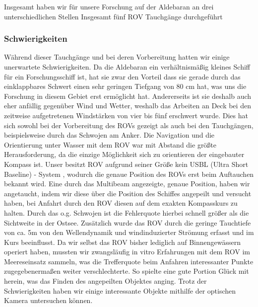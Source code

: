 Insgesamt haben wir für unsere Forschung auf der Aldebaran an drei unterschiedlichen Stellen Insgesamt fünf ROV Tauchgänge durchgeführt 
\subsubsection{Schwierigkeiten}
Während dieser Tauchgänge und bei deren Vorbereitung hatten wir einige unerwartete Schwierigkeiten.
Da die Aldebaran ein verhältnismäßig kleines Schiff für ein Forschungsschiff ist, hat sie zwar den Vorteil dass sie gerade durch das einklappbares Schwert einen sehr geringen Tiefgang von 80 cm hat, was uns die Forschung in diesem Gebiet erst ermöglicht hat.
Andererseits ist sie deshalb auch eher anfällig gegenüber Wind und Wetter, weshalb das Arbeiten an Deck bei den zeitweise aufgetretenen Windstärken von vier bis fünf erschwert wurde.
Dies hat sich sowohl bei der Vorbereitung des ROVs gezeigt als auch bei den Tauchgängen, beispielsweise durch das Schwojen am Anker.
Die Navigation und die Orientierung unter Wasser mit dem ROV war mit Abstand die größte Herausforderung, da die einzige Möglichkeit sich zu orientieren der eingebauter Kompass ist.
Unser besitzt ROV aufgrund seiner Größe kein USBL (Ultra Short Baseline) - System , wodurch die genaue Position des ROVs erst beim Auftauchen bekannt wird.
Eine durch das Multibeam angezeigte, genaue Position, haben wir angetaucht, indem wir diese über die Position des Schiffes angepeilt und versucht haben, bei Anfahrt durch den ROV diesen auf dem exakten Kompasskurs zu halten.
Durch das o.g. Schwojen ist die Fehlerquote hierbei schnell größer als die Sichtweite in der Ostsee. Zusätzlich wurde das ROV 
durch die geringe Tauchtiefe von ca. 5m von den Wellendynamik und windinduzierter Strömung erfasst und im Kurs beeinflusst. 
Da wir selbst das ROV bisher lediglich auf Binnengewässern operiert haben, mussten wir zwangsläufig in vitro Erfahrungen mit dem ROV im Meereseinsatz sammeln, was die Trefferquote beim Anfahren interessanter Punkte zugegebenermaßen weiter verschlechterte. So spielte eine gute Portion Glück mit herein, was das Finden des angepeilten Objektes anging.
Trotz der Schwierigkeiten haben wir einige interessante Objekte mithilfe der optischen Kamera untersuchen können.\\

